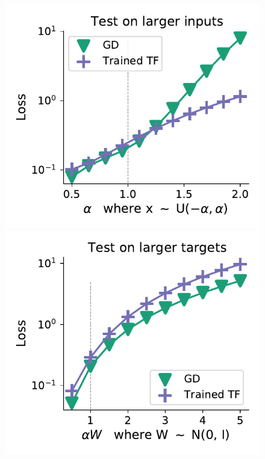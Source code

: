 \documentclass{article}
\theoremstyle{plain}
\theoremstyle{definition}
\theoremstyle{remark}
\begin{document}
\begin{figure}
\begin{center}
\begin{minipage}{.28\textwidth}
\begin{center}
  \end{center}
  \vspace{-10pt}
\end{minipage}
\begin{minipage}{.23\textwidth}
  \centering
  \begin{center}
    \includegraphics[width=1.\textwidth]{Final_figures/LayerNorm/normal_26.pdf}
  \end{center}
  \vspace{-10pt}
\end{minipage}
\begin{minipage}{.23\textwidth}
  \centering
  \begin{center}
    \includegraphics[width=1.\textwidth]{Final_figures/LayerNorm/normal_25.pdf}

\end{center}
\end{minipage}
\end{center}
\end{figure}
\end{document}
